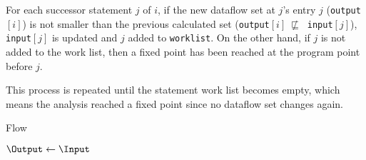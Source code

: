 For each successor statement $j$ of $i$, if the new
dataflow set at $j$'s entry $j$ (\texttt{output}$[i]$)
is not smaller than the previous calculated set
(\texttt{output}$[i]\ \not\sqsubseteq\ $ \texttt{input}$[j]$),
\texttt{input}$[j]$ is updated and $j$ added to \texttt{worklist}.
On the other hand, if $j$ is not added to the work list, then
a fixed point has been reached at the program point before $j$.

This process is repeated until the statement work list
becomes empty, which means the analysis reached a
fixed point since no dataflow set changes again.

\IncMargin{1em}
\begin{algorithm}
\caption{Flow}\label{fig:algoFlow}
\SetAlgoLined
\LinesNumbered
\DontPrintSemicolon
{}


$\Output \leftarrow \Input$\;
\end{algorithm}
\DecMargin{1em}

